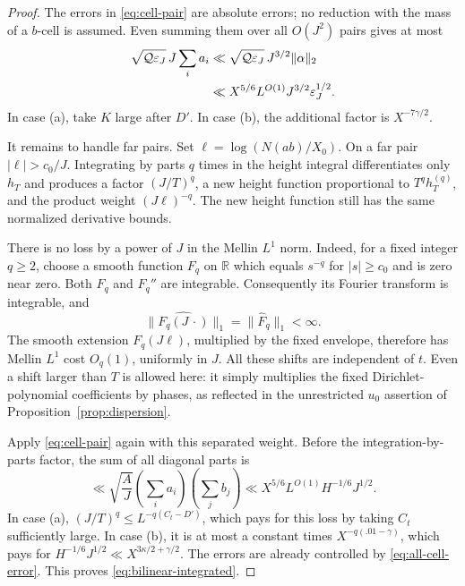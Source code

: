 \begin{proof}
The errors in \eqref{eq:cell-pair} are absolute errors; no reduction
with the mass of a \(b\)-cell is assumed. Even summing them over all
\(O(J^2)\) pairs gives at most
\begin{align}
 \sqrt{\mathcal Q\varepsilon_J}\,J\sum_i a_i
 &\ll \sqrt{\mathcal Q\varepsilon_J}\,J^{3/2}\|\alpha\|_2
       \notag\\
 &\ll X^{5/6}L^{O(1)}J^{3/2}\varepsilon_J^{1/2}.
 \label{eq:all-cell-error}
\end{align}
In case (a), take \(K\) large after \(D'\). In case (b), the
additional factor is \(X^{-7\gamma/2}\).

It remains to handle far pairs. Set
\(\ell=\log(N(ab)/X_0)\). On a far pair \(|\ell|>c_0/J\).
Integrating by parts \(q\) times in the height integral differentiates
only \(h_T\) and produces a factor \((J/T)^q\), a new height
function proportional to \(T^q h_T^{(q)}\), and the product weight
\((J\ell)^{-q}\). The new height function still has the same
normalized derivative bounds.

There is no loss by a power of \(J\) in the Mellin \(L^1\) norm.
Indeed, for a fixed
integer \(q\ge2\), choose a smooth function \(F_q\) on \(\mathbb R\)
which equals \(s^{-q}\) for \(|s|\ge c_0\) and is zero near zero.
Both \(F_q\) and \(F_q''\) are integrable. Consequently its Fourier
transform is integrable, and
\[
 \|\widehat{F_q(J\,\cdot)}\|_1=\|\widehat F_q\|_1<\infty.
\]
The smooth extension \(F_q(J\ell)\), multiplied by the fixed
envelope, therefore has Mellin \(L^1\) cost \(O_q(1)\), uniformly
in \(J\). All these shifts are independent of \(t\). Even a shift
larger than \(T\) is allowed here: it simply multiplies the fixed
Dirichlet-polynomial coefficients by phases, as reflected in the
unrestricted \(u_0\) assertion of Proposition~\ref{prop:dispersion}.

Apply \eqref{eq:cell-pair} again with this separated weight. Before
the integration-by-parts factor, the sum of all diagonal parts is
\begin{equation}
 \ll\sqrt{\frac A J}\left(\sum_i a_i\right)
                         \left(\sum_j b_j\right)
 \ll X^{5/6}L^{O(1)}H^{-1/6}J^{1/2}.
 \label{eq:far-cell-diagonal}
\end{equation}
In case (a), \((J/T)^q\le L^{-q(C_t-D')}\), which pays for this
loss by taking \(C_t\) sufficiently large. In case (b), it is at
most a constant times \(X^{-q(.01-\gamma)}\), which pays for
\(H^{-1/6}J^{1/2}\ll X^{3\kappa/2+\gamma/2}\).
The errors are already controlled by \eqref{eq:all-cell-error}.
This proves \eqref{eq:bilinear-integrated}.
\end{proof}

